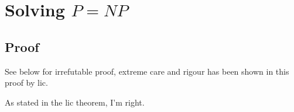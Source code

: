 \chapter{Solving $P=NP$}

\section{Proof}
See below for irrefutable proof, extreme care and rigour has been shown in this proof by \gls{lic}.\par



As stated in the \gls{lic} theorem, I'm right.
